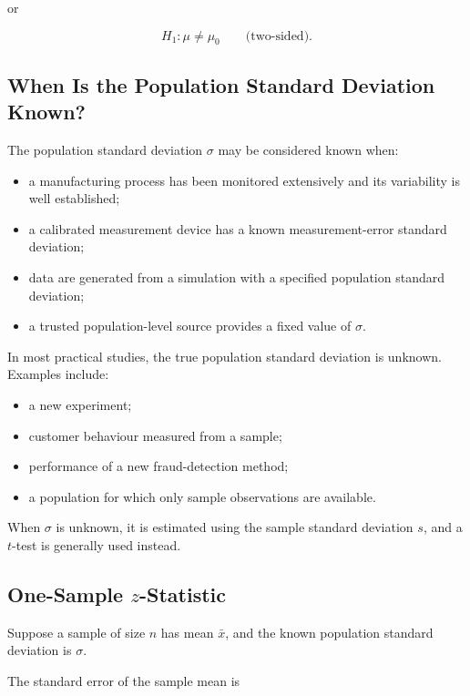 \documentclass[11pt]{article}
\begin{document}
or

\[
H_1:\mu\neq\mu_0
\qquad \text{(two-sided)}.
\]

\subsection{When Is the Population Standard Deviation Known?}

The population standard deviation \(\sigma\) may be considered known
when:

\begin{itemize}[noitemsep]
    \item a manufacturing process has been monitored extensively and its
    variability is well established;

    \item a calibrated measurement device has a known measurement-error
    standard deviation;

    \item data are generated from a simulation with a specified
    population standard deviation;

    \item a trusted population-level source provides a fixed value of
    \(\sigma\).
\end{itemize}

In most practical studies, the true population standard deviation is
unknown. Examples include:

\begin{itemize}[noitemsep]
    \item a new experiment;
    \item customer behaviour measured from a sample;
    \item performance of a new fraud-detection method;
    \item a population for which only sample observations are available.
\end{itemize}

When \(\sigma\) is unknown, it is estimated using the sample standard
deviation \(s\), and a \(t\)-test is generally used instead.

\subsection{One-Sample \(z\)-Statistic}

Suppose a sample of size \(n\) has mean \(\bar{x}\), and the known
population standard deviation is \(\sigma\).

The standard error of the sample mean is
\end{document}
